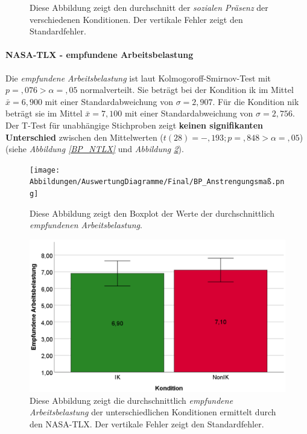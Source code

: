 \documentclass[a4paper,11pt]{article}%
\renewcommand{\\}{\vspace*{0.5\baselineskip} \newline}
\begin{document}
{\begin{figure}[H]
\begin{minipage}[t]{.5\linewidth}
      \caption[Durchschnittliche soziale Präsenz]{Diese Abbildung zeigt den durchschnitt der \textit{sozialen Präsenz} der verschiedenen Konditionen. Der vertikale Fehler zeigt den Standardfehler.}
       \label{SD_SocialPresence_Mittelwerte}
   \end{minipage}
\end{figure}

\newpage

\paragraph{NASA-TLX - empfundene Arbeitsbelastung}
\label{NASA-TLX}
Die \textit{empfundene Arbeitsbelastung} ist laut  Kolmogoroff-Smirnov-Test mit $p =,076 > \alpha = ,05$ normalverteilt. 
Sie beträgt bei der Kondition \ac{ik} im Mittel $\bar{x} = 6,900$ mit einer Standardabweichung von $\sigma = 2,907$.
Für die Kondition \ac{nik} beträgt sie im Mittel $\bar{x} = 7,100$ mit einer Standardabweichung von $\sigma = 2,756$. 
Der T-Test für unabhängige Stichproben zeigt \textbf{keinen signifikanten Unterschied} zwischen den Mittelwerten ($t(28) = -,193; p =,848 > \alpha = ,05$) (siehe \textit{Abbildung \ref{BP_NTLX}} und \textit{Abbildung \ref{SD_NTLX_Mittelwerte}}).

	\begin{figure}[H]
   \begin{minipage}[t]{.5\linewidth} %
      \texttt{[image: Abbildungen/AuswertungDiagramme/Final/BP\_Anstrengungsmaß.png]}
      \caption[Boxplot der empfundenen Arbeitsbelastung]{Diese Abbildung zeigt den Boxplot der Werte der durchschnittlich \textit{empfundenen Arbeitsbelastung}.}
            \label{BP_NTLX}
   \end{minipage}
   \hspace{.02\linewidth}%
   \begin{minipage}[t]{.5\linewidth} %
     \includegraphics[width=\linewidth]{Abbildungen/AuswertungDiagramme/Final/SD_NTLX_Mittelwerte.png}
      \caption[Durchschnittlich empfundene Arbeitsbelastung]{Diese Abbildung zeigt die durchschnittlich \textit{empfundene Arbeitsbelastung} der unterschiedlichen Konditionen ermittelt durch den NASA-TLX. Der vertikale Fehler zeigt den Standardfehler.}
       \label{SD_NTLX_Mittelwerte}
   \end{minipage}
\end{figure}

}
\end{document}
